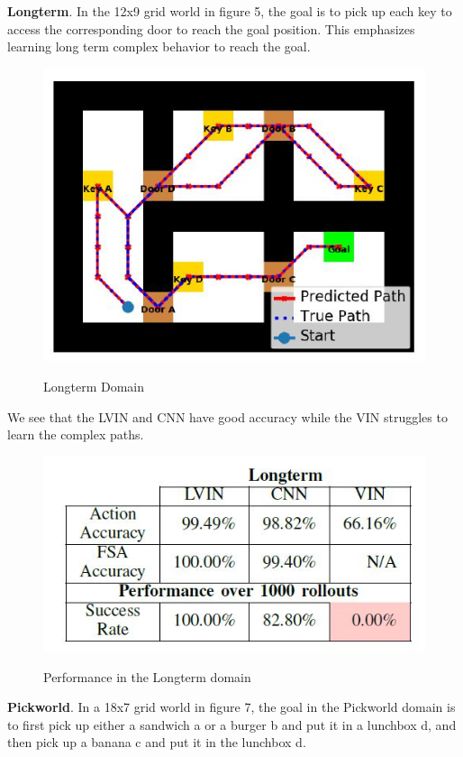 \documentclass[letterpaper, 10 pt, conference]{ieeeconf}  %
\begin{document}
\newline
\textbf{Longterm}. In the 12x9 grid world in figure 5, the goal is to pick up each key to access the corresponding door to reach the goal position. This emphasizes learning long term complex behavior to reach the goal.
\begin{figure}[h]
 \centering
 \includegraphics[scale=.5]{Longterm.JPG}\\
 \caption{Longterm Domain}
\end{figure}
\newpage
We see that the LVIN and CNN have good accuracy while the VIN struggles to learn the complex paths.
\begin{figure}[h!]
 \centering
 \includegraphics[scale=.6]{LongtermResults.JPG}\\
 \caption{Performance in the Longterm domain}
\end{figure}
\newline
\textbf{Pickworld}. In a 18x7 grid world in figure 7, the goal in the Pickworld domain is to first pick up either a sandwich a or a burger b and put it in a lunchbox d, and then pick up a banana c and put it in the lunchbox d.
\end{document}
